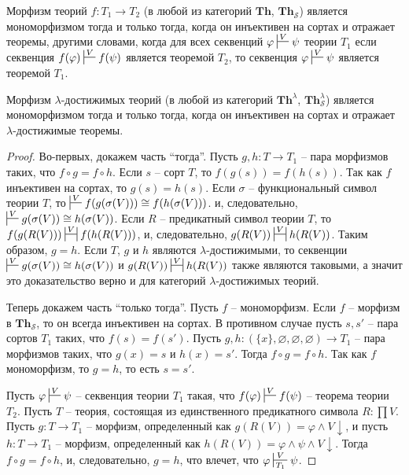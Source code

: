 \documentclass[reqno]{amsart}
\theoremstyle{definition}
\theoremstyle{remark}
\newcommand{\bcat}[1]{\mathbf{#1}}
\newcommand{\Th}{\bcat{Th}}
\begin{document}
\begin{prop}[th-mono]
Морфизм теорий $f : T_1 \to T_2$ (в любой из категорий $\Th$, $\Th_\mathcal{S}$) является мономорфизмом тогда и только тогда,
когда он инъективен на сортах и отражает теоремы, другими словами, когда для всех секвенций $\varphi \sststile{}{V} \psi$ теории $T_1$
если секвенция $f(\varphi) \sststile{}{V} f(\psi)$ является теоремой $T_2$, то секвенция $\varphi \sststile{}{V} \psi$ является теоремой $T_1$.

Морфизм $\lambda$-достижимых теорий (в любой из категорий $\Th^\lambda$, $\Th_\mathcal{S}^\lambda$) является мономорфизмом тогда и только тогда, когда он инъективен на сортах и отражает $\lambda$-достижимые теоремы.
\end{prop}
\begin{proof}
Во-первых, докажем часть ``тогда''.
Пусть $g,h : T \to T_1$ -- пара морфизмов таких, что $f \circ g = f \circ h$.
Если $s$ -- сорт $T$, то $f(g(s)) = f(h(s))$.
Так как $f$ инъективен на сортах, то $g(s) = h(s)$.
Если $\sigma$ -- функциональный символ теории $T$, то $\sststile{}{V} f(g(\sigma(V))) \cong f(h(\sigma(V)))$. и, следовательно, $\sststile{}{V} g(\sigma(V)) \cong h(\sigma(V))$.
Если $R$ -- предикатный символ теории $T$, то $f(g(R(V))) \ssststile{}{V} f(h(R(V)))$, и, следовательно, $g(R(V)) \ssststile{}{V} h(R(V))$.
Таким образом, $g = h$.
Если $T$, $g$ и $h$ являются $\lambda$-достижимыми, то секвенции $\sststile{}{V} g(\sigma(V)) \cong h(\sigma(V))$ и $g(R(V)) \ssststile{}{V} h(R(V))$ также являются таковыми, а значит это доказательство верно и для категорий $\lambda$-достижимых теорий.

Теперь докажем часть ``только тогда''.
Пусть $f$ -- мономорфизм.
Если $f$ -- морфизм в $\Th_\mathcal{S}$, то он всегда инъективен на сортах.
В противном случае пусть $s,s'$ -- пара сортов $T_1$ таких, что $f(s) = f(s')$.
Пусть $g,h : (\{x\},\varnothing,\varnothing,\varnothing) \to T_1$ -- пара морфизмов таких, что $g(x) = s$ и $h(x) = s'$.
Тогда $f \circ g = f \circ h$.
Так как $f$ мономорфизм, то $g = h$, то есть $s = s'$.

Пусть $\varphi \sststile{}{V} \psi$ -- секвенция теории $T_1$ такая, что $f(\varphi) \sststile{}{V} f(\psi)$ -- теорема теории $T_2$.
Пусть $T$ -- теория, состоящая из единственного предикатного символа $R : \prod V$.
Пусть $g : T \to T_1$ -- морфизм, определенный как $g(R(V)) = \varphi \land V\!\downarrow$, и пусть $h : T \to T_1$ -- морфизм, определенный как $h(R(V)) = \varphi \land \psi \land V\!\downarrow$.
Тогда $f \circ g = f \circ h$, и, следовательно, $g = h$, что влечет, что $\varphi \sststile{T_1}{V} \psi$.
\end{proof}
\end{document}
